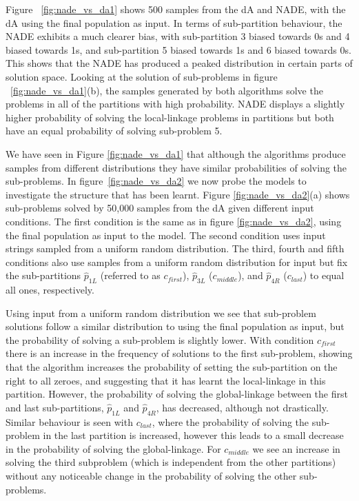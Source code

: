 \documentclass[twoside]{article}
\begin{document}
Figure ~\ref{fig:nade_vs_da1} shows 500 samples from the dA and NADE, with the dA using the final population as input. In terms of sub-partition behaviour, the NADE exhibits a much clearer bias, with sub-partition 3 biased towards 0s and 4 biased towards 1s, and sub-partition 5 biased towards 1s and 6 biased towards 0s. This shows that the NADE has produced a peaked distribution in certain parts of solution space. Looking at the solution of sub-problems in figure ~\ref{fig:nade_vs_da1}(b), the samples generated by both algorithms solve the problems in all of the partitions with high probability. NADE displays a slightly higher probability of solving the local-linkage problems in partitions but both have an equal probability of solving sub-problem 5.

We have seen in Figure \ref{fig:nade_vs_da1} that although the algorithms produce samples from different distributions they have similar probabilities of solving the sub-problems. In figure~\ref{fig:nade_vs_da2} we now probe the models to investigate the structure that has been learnt. Figure \ref{fig:nade_vs_da2}(a) shows sub-problems solved by 50,000 samples from the dA given different input conditions. The first condition is the same as in figure \ref{fig:nade_vs_da2}, using the final population as input to the model. The second condition uses input strings sampled from a uniform random distribution. The third, fourth and fifth conditions also use samples from a uniform random distribution for input but fix the sub-partitions \(\hat{p}_{1L}\) (referred to as \(c_{first}\)),  \(\hat{p}_{3L}\) (\(c_{middle}\)), and \(\hat{p}_{4R}\) (\(c_{last}\)) to equal all ones, respectively.

Using input from a uniform random distribution we see that sub-problem solutions follow a similar distribution to using the final population as input, but the probability of solving a sub-problem is slightly lower. With condition \(c_{first}\) there is an increase in the frequency of solutions to the first sub-problem, showing that the algorithm increases the probability of setting the sub-partition on the right to all zeroes, and suggesting that it has learnt the local-linkage in this partition. However, the probability of solving the global-linkage between the first and last sub-partitions, \(\hat{p}_{1L}\) and \(\hat{p}_{4R}\), has decreased, although not drastically. Similar behaviour is seen with \(c_{last}\), where the probability of solving the sub-problem in the last partition is increased, however this leads to a small decrease in the probability of solving the global-linkage. For \(c_{middle}\) we see an increase in solving the third subproblem (which is independent from the other partitions) without any noticeable change in the probability of solving the other sub-problems.
\end{document}
